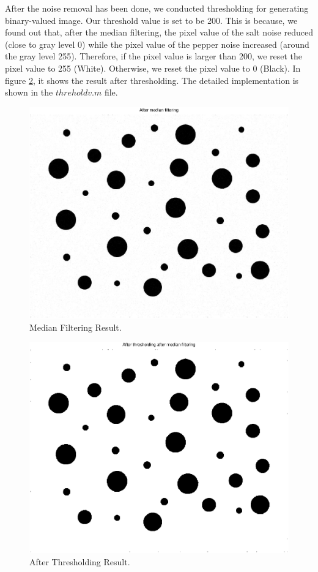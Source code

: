 \documentclass[paper=a4, fontsize=11pt]{scrartcl}
\begin{document}
After the noise removal has been done, we conducted thresholding for generating binary-valued image. Our threshold value is set to be 200. This is because, we found out that, after the median filtering, the pixel value of the salt noise reduced (close to gray level 0) while the pixel value of the pepper noise increased (around the gray level 255). Therefore, if the pixel value is larger than 200, we reset the pixel value to 255 (White). Otherwise, we reset the pixel value to 0 (Black). In figure \ref{fig:2}, it shows the result after thresholding. The detailed implementation is shown in the $threholdv.m$ file.

\begin{figure}
	\centering
	\includegraphics[width=12cm]{after_medianfiltering.eps}
	\caption{Median Filtering Result.}
	\label{fig:1}
\end{figure}


\begin{figure}
	\centering
	\includegraphics[width=12cm]{AfterThresholdingAfterMedianFiltering.eps}
	\caption{After Thresholding Result.}
	\label{fig:2}
\end{figure}
\end{document}
